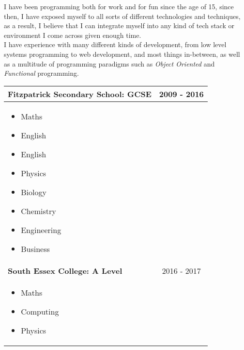 \documentclass[11pt, twoside, a4paper]{article}
\newlength{\cvSideWidth}
\begin{document}
\begin{minipage}[t]{\textwidth - \cvSideWidth - 3cm}

    { \LARGE {} }

    I have been programming both for work and for fun since the age of 15,
    since then, I have exposed myself to all sorts of different
    technologies and techniques, as a result, I believe that I can 
    integrate myself into any kind of tech stack or environment I come across
    given enough time. \\

    I have experience with many different kinds of development, from low level 
    systems programming to web development, and most things in-between, as well 
    as a multitude of programming paradigms such as \textit{Object Oriented} and 
    \textit{Functional} programming.

    { \vspace{0.5cm} \LARGE {} }

    \begin{center}
        \begin{tabularx}{0.9\textwidth}{ >{\raggedright\arraybackslash}X c}
            \textbf{Fitzpatrick Secondary School: GCSE} & 2009 - 2016 \\
            \hline
            \begin{itemize}
                \item Maths               
                \item English 
                \item English 
                \item Physics             
                \item Biology             
                \item Chemistry           
                \item Engineering         
                \item Business            
            \end{itemize} \\

            \textbf{South Essex College: A Level} & 2016 - 2017 \\
            \hline
            \begin{itemize}
                \item Maths
                \item Computing
                \item Physics
            \end{itemize} \\


\end{tabularx}
\end{center}
\end{minipage}
\end{document}
